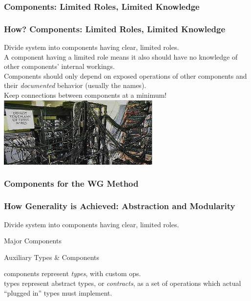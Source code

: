 \documentclass[compress]{beamer}
\begin{document}
\subsubsection{Components: Limited Roles, Limited Knowledge}

\begin{frame}
  \frametitle{How? Components: Limited Roles, Limited Knowledge}
  Divide system into components having clear, limited roles.
  \pause
   \raisebox{3mm}{$\implies$} \\
  A component having a limited role means it also should have no knowledge of other components' internal workings.\\
  \pause
  Components should only depend on exposed operations of other components and their \emph{documented} behavior (usually the names).\\
  \pause
  Keep connections between components at a minimum!
  \includegraphics[height=3.5cm]{img/crazy-wiring.jpg}
\end{frame}

\subsubsection{Components for the WG Method}

\begin{frame}
  \frametitle{How Generality is Achieved: Abstraction and Modularity}
  Divide system into components having clear, limited roles.\\
  \pause
  \begin{block}{Major Components}
  \end{block}
  \pause
  \begin{block}{Auxiliary Types \& Components}
  \end{block}
  \pause
   components represent \emph{types}, with custom ops.\\
  \pause
   types represent abstract
  types, or \emph{contracts}, as a set of operations which actual ``plugged in'' types must implement.
\end{frame}
\end{document}

